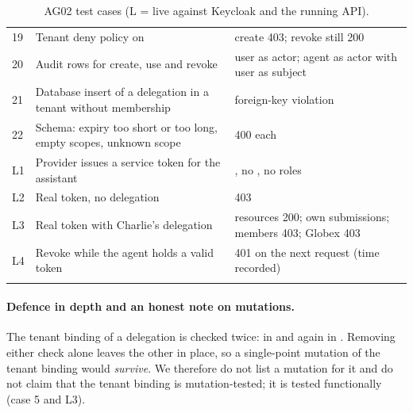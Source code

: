 \begin{longtable}{@{}P{0.6cm} P{8.6cm} P{4.2cm}@{}}
19 & Tenant deny policy on  & create 403; revoke still 200\\
20 & Audit rows for create, use and revoke & user as actor; agent as actor with user as subject\\
21 & Database insert of a delegation in a tenant without membership & foreign-key violation\\
22 & Schema: expiry too short or too long, empty scopes, unknown scope & 400 each\\
L1 & Provider issues a service token for the assistant & , no , no roles\\
L2 & Real token, no delegation & 403\\
L3 & Real token with Charlie's delegation & resources 200; own submissions; members 403; Globex 403\\
L4 & Revoke while the agent holds a valid token & 401 on the next request (time recorded)\\
\bottomrule
\caption{AG02 test cases (L = live against Keycloak and the running API).}
\end{longtable}

\paragraph{Defence in depth and an honest note on mutations.} The tenant binding of a delegation is checked twice: in  and again in . Removing either check alone leaves the other in place, so a single-point mutation of the tenant binding would \emph{survive}. We therefore do not list a mutation for it and do not claim that the tenant binding is mutation-tested; it is tested functionally (case 5 and L3).
